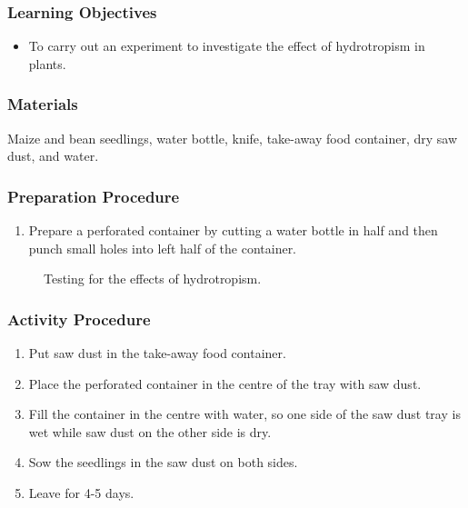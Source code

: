 \subsubsection*{Learning Objectives}
\begin{itemize}
\item{To carry out an experiment to investigate the effect of hydrotropism in plants.}
\end{itemize}

\subsubsection*{Materials}
Maize and bean seedlings, water bottle, knife, take-away food container, dry saw dust, and water.

\subsubsection*{Preparation Procedure}
\begin{enumerate}
\item{Prepare a perforated container by cutting a water bottle in half and then punch small holes into left half of the container.}
\end{enumerate}

\begin{figure}[h]
\begin{center}
\def\svgwidth{12cm}

\caption{Testing for the effects of hydrotropism.}
\label{fig:hydro}
\end{center}
\end{figure}

\subsubsection*{Activity Procedure}
\begin{enumerate}
\item{Put saw dust in the take-away food container.}
\item{Place the perforated container in the centre of the tray with saw dust.}
\item{Fill the container in the centre with water, so one side of the saw dust tray is wet while saw dust on the other side is dry.}
\item{Sow the seedlings in the saw dust on both sides.}
\item{Leave for 4-5 days.}
\end{enumerate}

